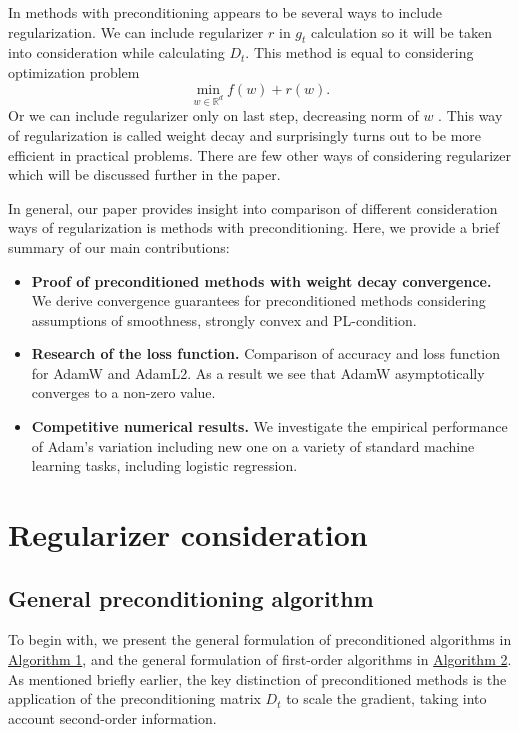 \documentclass{article}
\begin{document}
In methods with preconditioning appears to be several ways to include regularization.
We can include regularizer $r$ in $g_t$ calculation so it will be taken into consideration while calculating $D_t$. This method is equal to considering optimization problem 
\begin{equation}
	\min_{w \in \mathbb{R}^d} f(w) + r(w).
\end{equation}
Or we can include regularizer only on last step, decreasing norm of $w$ \citep{loshchilov2017decoupled}.
This way of regularization is called weight decay and surprisingly turns out to be more efficient in practical problems.
There are few other ways of considering regularizer which will be discussed further in the paper.

In general, our paper provides insight into comparison of different consideration ways of regularization is methods with preconditioning. Here, we provide a brief summary of our main contributions:

\begin{itemize}
    \item \textbf{Proof of preconditioned methods with weight decay convergence.}  We derive convergence guarantees for preconditioned methods considering assumptions of smoothness, strongly convex and PL-condition.
    
    \item \textbf{Research of the loss function.} Comparison of accuracy and loss function for AdamW and AdamL2. As a result we see that AdamW asymptotically converges to a non-zero value.
    
    \item \textbf{Competitive numerical results.} We investigate the empirical performance of Adam's variation including new one on a variety of standard machine learning tasks, including logistic regression.
\end{itemize}


\section{Regularizer consideration}

\subsection{General preconditioning algorithm}

To begin with, we present the general formulation of preconditioned algorithms in \hyperref[alg:precond]{Algorithm 1}, and the general formulation of first-order algorithms in \hyperref[alg:first]{Algorithm 2}.
As mentioned briefly earlier, the key distinction of preconditioned methods is the application of the preconditioning matrix $D_t$ to scale the gradient, taking into account second-order information.
\end{document}
